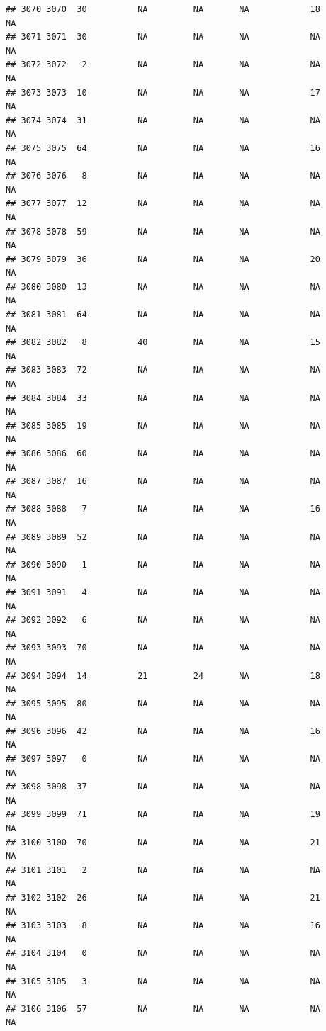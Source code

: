 \documentclass[man]{apa6}
\begin{document}
\begin{verbatim}
## 3070 3070  30          NA         NA       NA            18       NA
## 3071 3071  30          NA         NA       NA            NA       NA
## 3072 3072   2          NA         NA       NA            NA       NA
## 3073 3073  10          NA         NA       NA            17       NA
## 3074 3074  31          NA         NA       NA            NA       NA
## 3075 3075  64          NA         NA       NA            16       NA
## 3076 3076   8          NA         NA       NA            NA       NA
## 3077 3077  12          NA         NA       NA            NA       NA
## 3078 3078  59          NA         NA       NA            NA       NA
## 3079 3079  36          NA         NA       NA            20       NA
## 3080 3080  13          NA         NA       NA            NA       NA
## 3081 3081  64          NA         NA       NA            NA       NA
## 3082 3082   8          40         NA       NA            15       NA
## 3083 3083  72          NA         NA       NA            NA       NA
## 3084 3084  33          NA         NA       NA            NA       NA
## 3085 3085  19          NA         NA       NA            NA       NA
## 3086 3086  60          NA         NA       NA            NA       NA
## 3087 3087  16          NA         NA       NA            NA       NA
## 3088 3088   7          NA         NA       NA            16       NA
## 3089 3089  52          NA         NA       NA            NA       NA
## 3090 3090   1          NA         NA       NA            NA       NA
## 3091 3091   4          NA         NA       NA            NA       NA
## 3092 3092   6          NA         NA       NA            NA       NA
## 3093 3093  70          NA         NA       NA            NA       NA
## 3094 3094  14          21         24       NA            18       NA
## 3095 3095  80          NA         NA       NA            NA       NA
## 3096 3096  42          NA         NA       NA            16       NA
## 3097 3097   0          NA         NA       NA            NA       NA
## 3098 3098  37          NA         NA       NA            NA       NA
## 3099 3099  71          NA         NA       NA            19       NA
## 3100 3100  70          NA         NA       NA            21       NA
## 3101 3101   2          NA         NA       NA            NA       NA
## 3102 3102  26          NA         NA       NA            21       NA
## 3103 3103   8          NA         NA       NA            16       NA
## 3104 3104   0          NA         NA       NA            NA       NA
## 3105 3105   3          NA         NA       NA            NA       NA
## 3106 3106  57          NA         NA       NA            NA       NA

\end{verbatim}
\end{document}
